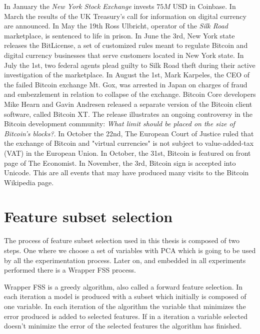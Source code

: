 In January the \textit{New York Stock Exchange} invests $75M$ USD in
Coinbase. In March the results of the UK Treasury's call for
information on digital currency are announced. In May the 19th Ross
Ulbricht, operator of the \textit{Silk Road} marketplace, is sentenced
to life in prison. In June the 3rd, New York state releases the
BitLicense, a set of customized rules meant to regulate Bitcoin and
digital currency businesses that serve customers located in New York
state. In July the 1st, two federal agents plead guilty to Silk Road
theft during their active investigation of the marketplace. In August
the 1st, Mark Karpeles, the CEO of the failed Bitcoin exchange Mt.
Gox, was arrested in Japan on charges of fraud and embezzlement in
relation to collapse of the exchange. Bitcoin Core developers Mike
Hearn and Gavin Andresen released a separate version of the Bitcoin
client software, called Bitcoin XT. The release illustrates an ongoing
controversy in the Bitcoin development community: \textit{What limit
  should be placed on the size of Bitcoin's blocks?}. In October the
22nd, The European Court of Justice ruled that the exchange of Bitcoin
and "virtual currencies" is not subject to value-added-tax (VAT) in
the European Union. In October, the 31st, Bitcoin is featured on front
page of The Economist. In November, the 3rd, Bitcoin sign is accepted
into Unicode. This are all events that may have produced many visits
to the Bitcoin Wikipedia page.


\section{Feature subset selection}
\label{sec:feature-selection}

The process of feature subset selection used in this thesis is
composed of two steps. One where we choose a set of variables with PCA
which is going to be used by all the experimentation process. Later
on, and embedded in all experiments performed there is a Wrapper FSS
process.

Wrapper FSS is a greedy algorithm, also called a forward feature
selection. In each iteration a model is produced with a subset which
initially is composed of one variable. In each iteration of the
algorithm the variable that minimizes the error produced is added to
selected features. If in a iteration a variable selected doesn't
minimize the error of the selected features the algorithm has
finished.

